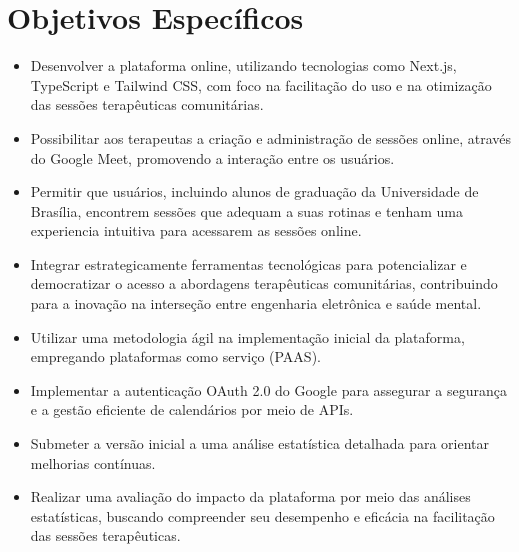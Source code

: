 \section*{Objetivos Específicos}
\begin{itemize}
        \item Desenvolver a plataforma online, utilizando tecnologias como Next.js, TypeScript e Tailwind CSS, com foco na facilitação do uso e na otimização das sessões terapêuticas comunitárias.
      \item Possibilitar aos terapeutas a criação e administração de sessões online, através do Google Meet, promovendo a interação entre os usuários.
        \item Permitir que usuários, incluindo alunos de graduação da Universidade de Brasília, encontrem sessões que adequam a suas rotinas e tenham uma experiencia intuitiva para acessarem as sessões online.
        \item Integrar estrategicamente ferramentas tecnológicas para potencializar e democratizar o acesso a abordagens terapêuticas comunitárias, contribuindo para a inovação na interseção entre engenharia eletrônica e saúde mental.
       \item Utilizar uma metodologia ágil na implementação inicial da plataforma, empregando plataformas como serviço (PAAS).
       \item Implementar a autenticação OAuth 2.0 do Google para assegurar a segurança e a gestão eficiente de calendários por meio de APIs.
       \item Submeter a versão inicial a uma análise estatística detalhada para orientar melhorias contínuas.
        \item Realizar uma avaliação do impacto da plataforma por meio das análises estatísticas, buscando compreender seu desempenho e eficácia na facilitação das sessões terapêuticas.
      \end{itemize}
